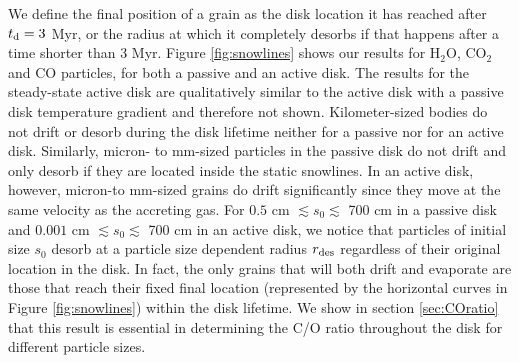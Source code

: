 \documentclass[apj]{emulateapj}
\begin{document}
We define the final position of a grain as the disk location it has reached after $t_{\rm d}=3$ Myr, or the radius at which it completely desorbs if that happens after a time shorter than 3 Myr.  Figure \ref{fig:snowlines} shows our results for H$_2$O, CO$_2$ and CO particles, for both a passive and an active disk. The results for the steady-state active disk are qualitatively similar to the active disk with a passive disk temperature gradient and therefore not shown. %
Kilometer-sized bodies do not drift or desorb during the disk lifetime neither for a passive nor for an active disk. Similarly, micron- to mm-sized particles in the passive disk do not drift and only %
desorb if %
they are located inside the static snowlines. %
In an active disk, however, micron-to mm-sized grains do drift significantly since they move at the same velocity as the accreting gas. For $0.5$ cm $\lesssim s_0 \lesssim$ 700 cm in a passive disk and $0.001$ cm $\lesssim s_0 \lesssim$ 700 cm in an active disk, we notice that particles of initial size $s_0$ desorb at a %
particle size dependent radius $r_{\rm des}$ regardless of their original location in the disk. In fact, the only grains that will both drift and evaporate are those that reach their fixed final location (represented by the horizontal curves in Figure \ref{fig:snowlines}) within the disk lifetime. We show in section \ref{sec:COratio} that this result is essential in determining the C/O ratio throughout the disk for different particle sizes. 
\end{document}
